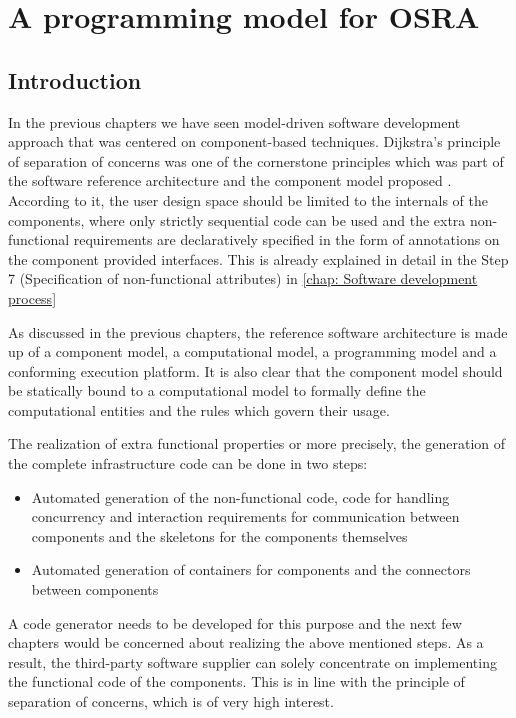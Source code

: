 
\chapter{A programming model for OSRA}
\label{chap: Progamming model}

\section{Introduction}
In the previous chapters we have seen model-driven software development approach that was centered on component-based techniques. Dijkstra's principle of separation of concerns was one of the cornerstone principles which was part of the software reference architecture and the component model proposed \cite{CompBasedProcess,EvoRAVCodeAr}. According to it, the user design space should be limited to the internals of the components, where only strictly sequential code can be used and the extra non-functional requirements are declaratively specified in the form of annotations on the component provided interfaces. This is already explained in detail in the Step 7 (Specification of non-functional attributes) in \cref{chap: Software development process} 

As discussed in the previous chapters, the reference software architecture is made up of a component model, a computational model, a programming model and a conforming execution platform. It is also clear that the component model should be statically bound to a computational model to formally define the computational entities and the rules which govern their usage.

The realization of extra functional properties or more precisely, the generation of the complete infrastructure code can be done in two steps:
\begin{itemize}
\item Automated generation of the non-functional code, code for handling concurrency and interaction requirements for communication between components and the skeletons for the components themselves
\item Automated generation of containers for components and the connectors between components 
\end{itemize}

A code generator needs to be developed for this purpose and the next few chapters would be concerned about realizing the above mentioned steps. As a result, the third-party software supplier can solely concentrate on implementing the functional code of the components. This is in line with the principle of separation of concerns, which is of very high interest.

